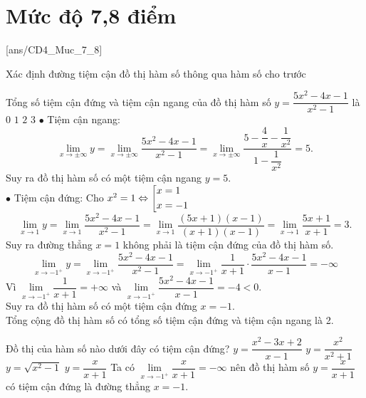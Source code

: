 \section{Mức độ 7,8 điểm}
[ans/CD4_Muc_7_8]
\begin{dang}{Xác định đường tiệm cận đồ thị hàm số thông qua hàm số cho trước}
\end{dang}
\begin{ex}%
	Tổng số tiệm cận đứng và tiệm cận ngang của đồ thị hàm số $ y=\dfrac{5x^2-4x-1}{x^2-1} $ là 
	\choice
	{$ 0 $}
	{$ 1 $}
	{\True $ 2 $}
	{$ 3 $}
	\loigiai
	{
		$ \bullet $ Tiệm cận ngang:
		\[\lim \limits_{x \to \pm\infty} y = \lim \limits_{x \to \pm \infty} \dfrac{5x^2-4x-1}{x^2-1} = \lim \limits_{x \to \pm \infty} \dfrac{5-\dfrac{4}{x}-\dfrac{1}{x^2}}{1-\dfrac{1}{x^2}}=5.\]
		Suy ra đồ thị hàm số có một tiệm cận ngang $ y=5 $.\\
		$ \bullet $ Tiệm cận đứng:
		Cho $x^2=1 \Leftrightarrow \left[\begin{aligned}&x=1\\&x=-1\end{aligned}\right.$
		\[\lim \limits_{x \to 1} y=\lim \limits_{x \to 1} \dfrac{5x^2-4x-1}{x^2-1} = \lim \limits_{x \to 1} \dfrac{(5x+1)(x-1)}{(x+1)(x-1)}=\lim \limits_{x \to 1} \dfrac{5x+1}{x+1}=3.\]
		Suy ra đường thẳng $ x=1 $ không phải là tiệm cận đứng của đồ thị hàm số.
		\[\lim \limits_{x \to -1^{+}} y=\lim \limits_{x \to -1^{+}} \dfrac{5x^2-4x-1}{x^2-1} = \lim \limits_{x \to -1^{+}} \dfrac{1}{x+1} \cdot \dfrac{5x^2-4x-1}{x-1}=-\infty \]
		Vì $\lim \limits_{x \to -1^{+}} \dfrac{1}{x+1} =+\infty$ và $\lim \limits_{x \to -1^{+}}\dfrac{5x^2-4x-1}{x-1} =-4<0$.\\
		Suy ra đồ thị hàm số có một tiệm cận đứng $ x=-1 $.\\
		Tổng cộng đồ thị hàm số có tổng số tiệm cận đứng và tiệm cận ngang là 2.
	}
\end{ex}
\begin{ex}%
	Đồ thị của hàm số nào dưới đây có tiệm cận đứng?
	\choice
	{$ y=\dfrac{x^2-3x+2}{x-1} $}
	{$ y=\dfrac{x^2}{x^2+1} $}
	{$ y=\sqrt{x^2-1} $}
	{\True $ y=\dfrac{x}{x+1} $}
	\loigiai
	{
		Ta có $ \lim \limits_{x \to -1^{+}} \dfrac{x}{x+1}=-\infty$ nên đồ thị hàm số $ y=\dfrac{x}{x+1} $ có tiệm cận đứng là đường thẳng $ x=-1 $.
	}
\end{ex}
